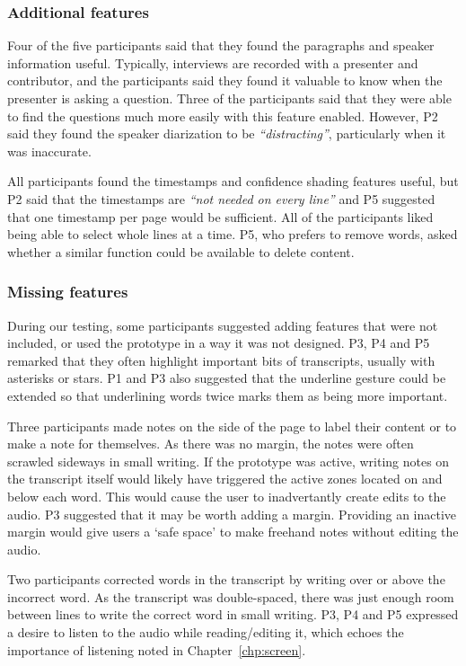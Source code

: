 \subsubsection{Additional features}

Four of the five participants said that they found the paragraphs and speaker information useful. Typically, interviews
are recorded with a presenter and contributor, and the participants said they found it valuable to know when the
presenter is asking a question. Three of the participants said that they were able to find the questions much more
easily with this feature enabled. However, P2 said they found the speaker diarization to be \textit{``distracting''},
particularly when it was inaccurate.

All participants found the timestamps and confidence shading features useful, but P2 said that the timestamps are
\textit{``not needed on every line''} and P5 suggested that one timestamp per page would be sufficient. All of the
participants liked being able to select whole lines at a time. P5, who prefers to remove words, asked whether a similar
function could be available to delete content.

\subsubsection{Missing features}

During our testing, some participants suggested adding features that were not included, or used the prototype in a
way it was not designed.
P3, P4 and P5 remarked that they often highlight important bits of transcripts, usually with asterisks or stars.
P1 and P3 also suggested that the underline gesture could be extended so that underlining words twice marks them as
being more important.

Three participants made notes on the side of the page to label their content or to make a note for themselves. As there
was no margin, the notes were often scrawled sideways in small writing. If the prototype was active, writing notes
on the transcript itself would likely have triggered the active zones located on and below each word. This would cause
the user to inadvertantly create edits to the audio. P3 suggested that it may be worth adding a margin. Providing an
inactive margin would give users a `safe space' to make freehand notes without editing the audio.

Two participants corrected words in the transcript by writing over or above the incorrect word. As the transcript was
double-spaced, there was just enough room between lines to write the correct word in small writing.
P3, P4 and P5 expressed a desire to listen to the audio while reading/editing it, which echoes the importance of
listening noted in Chapter~\ref{chp:screen}.

